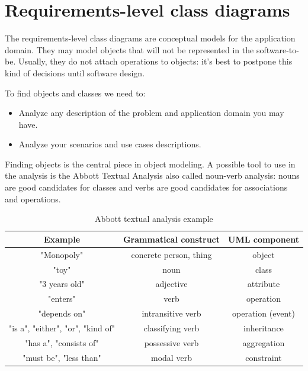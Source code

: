 \documentclass[12pt, a4paper]{report}
\begin{document}
    \section{Requirements-level class diagrams}
    The requirements-level class diagrams are conceptual models for the application domain. They may model objects that will not be represented in the software-to-be. Usually, they 
    do not attach operations to objects: it's best to postpone this kind of decisions until software design. 
     
    To find objects and classes we need to:
    \begin{itemize}
        \item Analyze any description of the problem and application domain you may have.
        \item Analyze your scenarios and use cases descriptions.
    \end{itemize}
    Finding objects is the central piece in object modeling. A possible tool to use in the analysis is the Abbott Textual Analysis also called noun-verb analysis: nouns are good 
    candidates for classes and verbs are good candidates for associations and operations. 
    \begin{table}[H]
        \centering
        \begin{tabular}{ccc}
        \textbf{Example}                  & \textbf{Grammatical construct} & \textbf{UML component} \\ \hline
        "Monopoly"                        & concrete person, thing         & object                 \\
        "toy"                             & noun                           & class                  \\ \hline
        "3 years old"                     & adjective                      & attribute              \\ \hline
        "enters"                          & verb                           & operation              \\
        "depends on"                      & intransitive verb              & operation (event)      \\ \hline
        "is a", "either", "or", "kind of" & classifying verb               & inheritance            \\ \hline
        "has a", "consists of"            & possessive verb                & aggregation            \\ \hline
        "must be", "less than"            & modal verb                     & constraint             \\ \hline
        \end{tabular}
        \caption{Abbott textual analysis example}
    \end{table}
\end{document}
